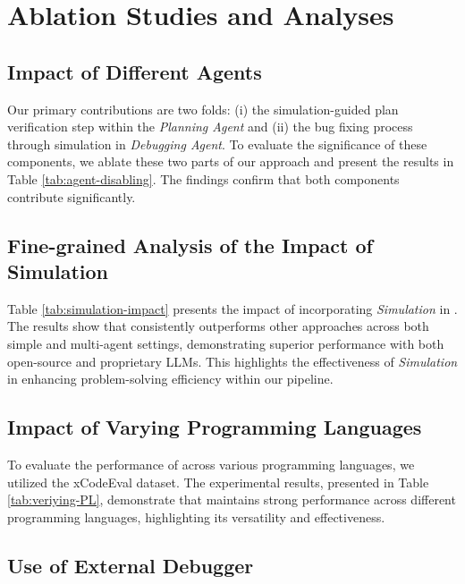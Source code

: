 \section{Ablation Studies and Analyses}
\label{sec:ablation-study}

\subsection{Impact of Different Agents}
\label{sec:agent-impact-ablation}
Our primary contributions are two folds: (i) the simulation-guided plan verification step within the \emph{Planning Agent} and (ii) the bug fixing process through simulation in \emph{Debugging Agent}. To evaluate the significance of these components, we ablate these two parts of our approach and present the results in Table \ref{tab:agent-disabling}. The findings confirm that both components contribute significantly. 





\subsection{Fine-grained Analysis of the Impact of Simulation}
\label{subsec:impact-simulation}
Table \ref{tab:simulation-impact} presents the impact of incorporating \textit{Simulation} in \toolnospace. The results show that \tool consistently outperforms other approaches across both simple and multi-agent settings, demonstrating superior performance with both open-source and proprietary LLMs. This highlights the effectiveness of \textit{Simulation} in enhancing problem-solving efficiency within our pipeline. 



\subsection{Impact of Varying Programming Languages}
\label{subsec:various-programming-languages}
To evaluate the performance of \tool across various programming languages, we utilized the xCodeEval \cite{khan2023xcodeeval} dataset. The experimental results, presented in Table \ref{tab:veriying-PL}, demonstrate that \tool maintains strong performance across different programming languages, highlighting its versatility and effectiveness.




\subsection{Use of External Debugger}
\label{subsec:ldb-debugger}

